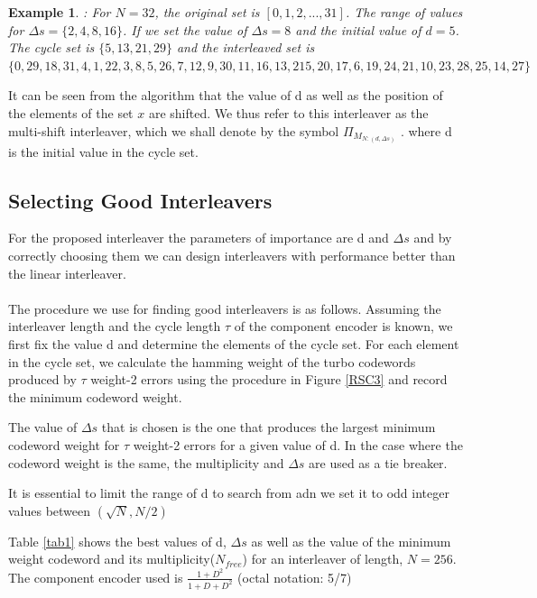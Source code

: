 \documentclass[20 pts]{article}
\newtheorem{example}[theorem]{Example}
\begin{document}
  \begin{example}
  \label{E2}
 : For $N=32$, the original set is $[0,1,2,...,31]$. The range of values for 
 $\Delta s = \{ 2,4,8,16\}$.  If we set the value
 of $\Delta s = 8$ and the initial value of $d=5$. 
 The cycle set is $\{ 5,13,21,29\}$ and the interleaved set is 
  $\{0, 29, 18, 31, 4, 1, 22, 3, 8, 5, 26, 7, 12, 9, 30, 11, 16, 13, 2
  15, 20, 17, 6, 19, 24, 21, 10, 23, 28,25, 14, 27\}$
 
 \end{example}
 It can be seen from the algorithm that the value of d as well as the position of the 
 elements of the set $x$ are shifted. We thus refer to this interleaver as the multi-shift 
 interleaver, which we shall denote by the symbol $\Pi_{\mathit{M}_{N:(d,\Delta s)}}$ .
 where d is the initial value in the cycle set.

 \subsection{Selecting Good Interleavers}
 For the proposed interleaver the parameters of importance are d and $\Delta s$ and
 by correctly choosing them we can design interleavers with performance better
 than the linear interleaver. 
  \paragraph{}
 The procedure we use for finding good interleavers is as follows. Assuming
 the interleaver length and the cycle length $\tau$ of the component 
 encoder is known, we first fix the value d and determine the elements of the cycle set.
 For each element in the cycle set, we calculate the hamming weight of the 
 turbo codewords 
 produced by $\tau$ weight-2 errors
 using the procedure in Figure \ref{RSC3} and record the minimum codeword weight. 

 
 The value of 
 $\Delta s$ that is chosen is the one that produces the largest minimum codeword 
 weight for $\tau$ weight-2 errors
 for a given value of d. In the case where the codeword weight is the same, the 
 multiplicity and $\Delta s$ are used as a tie breaker.
 
 It is essential to limit the range of d to search from adn we set it to
 odd integer values between $(\sqrt{N},N/2)$
 
 
 Table \ref{tab1} shows the best values of d, $\Delta s$
 as well as the value of the minimum weight codeword and its multiplicity($N_{free}$)
  for an interleaver 
 of length, $N=256$. The component encoder used is $\frac{1 + D^2}{1+D+D^2}$ 
 (octal notation: 5/7) 
 
\end{document}
